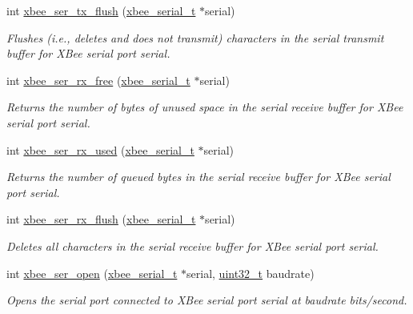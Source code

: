 \begin{DoxyCompactItemize}
int \hyperlink{group__hal__rabbit_ga05308d37301d27715f1e1308b7189220}{xbee\-\_\-ser\-\_\-tx\-\_\-flush} (\hyperlink{structxbee__serial__t}{xbee\-\_\-serial\-\_\-t} $\ast$serial)
\begin{DoxyCompactList}\small\item\em Flushes (i.\-e., deletes and does not transmit) characters in the serial transmit buffer for X\-Bee serial port {\itshape serial}. \end{DoxyCompactList}\item 
int \hyperlink{group__hal__rabbit_ga16fb431a1e66861439518e562431821f}{xbee\-\_\-ser\-\_\-rx\-\_\-free} (\hyperlink{structxbee__serial__t}{xbee\-\_\-serial\-\_\-t} $\ast$serial)
\begin{DoxyCompactList}\small\item\em Returns the number of bytes of unused space in the serial receive buffer for X\-Bee serial port {\itshape serial}. \end{DoxyCompactList}\item 
int \hyperlink{group__hal__rabbit_ga43b8322771cc16b4130fa5330ad2242b}{xbee\-\_\-ser\-\_\-rx\-\_\-used} (\hyperlink{structxbee__serial__t}{xbee\-\_\-serial\-\_\-t} $\ast$serial)
\begin{DoxyCompactList}\small\item\em Returns the number of queued bytes in the serial receive buffer for X\-Bee serial port {\itshape serial}. \end{DoxyCompactList}\item 
int \hyperlink{group__hal__rabbit_ga98a6d5ceb5e1445e8ef82ccaa65a8c15}{xbee\-\_\-ser\-\_\-rx\-\_\-flush} (\hyperlink{structxbee__serial__t}{xbee\-\_\-serial\-\_\-t} $\ast$serial)
\begin{DoxyCompactList}\small\item\em Deletes all characters in the serial receive buffer for X\-Bee serial port {\itshape serial}. \end{DoxyCompactList}\item 
int \hyperlink{group__hal__rabbit_gaa615a221dd69c17ee2989c281f2bf04a}{xbee\-\_\-ser\-\_\-open} (\hyperlink{structxbee__serial__t}{xbee\-\_\-serial\-\_\-t} $\ast$serial, \hyperlink{group__hal__dos_ga09a1e304d66d35dd47daffee9731edaa}{uint32\-\_\-t} baudrate)
\begin{DoxyCompactList}\small\item\em Opens the serial port connected to X\-Bee serial port {\itshape serial} at {\itshape baudrate} bits/second. \end{DoxyCompactList}\item 

\end{DoxyCompactItemize}
